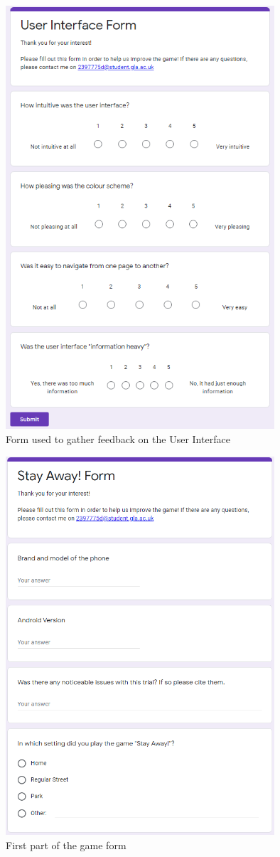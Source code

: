 \documentclass{dissertation}
\begin{document}
\begin{appendices}
\begin{figure}[H]
\centering
\includegraphics[width = 10cm]{images/ui-form.png}
\caption{Form used to gather feedback on the User Interface}
\label{fig:ui-form}
\end{figure}

\begin{figure}[H]
\centering
\includegraphics[width = 10cm]{images/game-form1.png}
\caption{First part of the game form}
\label{fig:gf1}
\end{figure}


\end{appendices}
\end{document}
